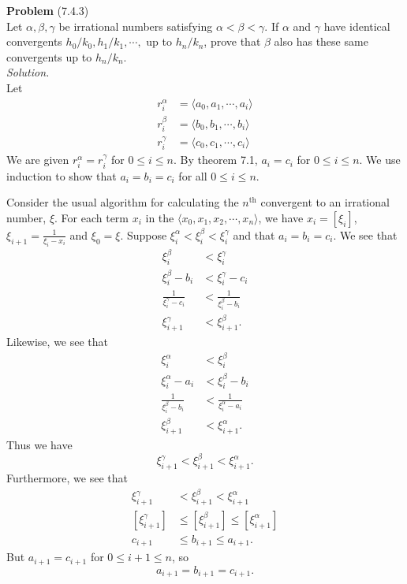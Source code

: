 \documentclass[12 pt]{amsart}
\begin{document}
\phantom{\quad} \vfill
\noindent
\textbf{Problem} (7.4.3) \\[4ex]
  Let $\alpha, \beta, \gamma$ be irrational numbers satisfying
  $\alpha < \beta < \gamma$.
  If $\alpha$ and $\gamma$ have identical convergents
  $h_0/k_0, h_1/k_1, \cdots,$ up to $h_n/k_n$, prove that
  $\beta$ also has these same convergents up to $h_n/k_n$.
  \\[2ex]
\emph{Solution.} \\[2ex]
  Let 
  \begin{align*}
    r_i^{\alpha} &= \langle a_0, a_1, \cdots, a_i \rangle \\
    r_i^{\beta} &= \langle b_0, b_1, \cdots, b_i \rangle \\
    r_i^{\gamma} &= \langle c_0, c_1, \cdots, c_i \rangle 
  \end{align*}
  We are given $r_i^{\alpha} = r_i^{\gamma}$ for
  $0 \leq i \leq n$.
  By theorem 7.1, $a_i = c_i$ for $0 \leq i \leq n$.
  We use induction to show that 
  $a_i = b_i = c_i$ for all $0 \leq i \leq n$.

  Consider the usual algorithm for calculating the 
  $n^{\text{th}}$ convergent to an irrational number, $\xi$.
  For each term $x_i$ in the 
  $\langle x_0, x_1, x_2, \cdots, x_n \rangle $, 
  we have $x_i = \left[ \xi_i \right]$,
  $\xi_{i+1} = \frac{1}{\xi_i - x_i}$ and 
  $\xi_0 = \xi$.
  Suppose 
  $\xi^{\alpha}_i < \xi^{\beta}_i < \xi^{\gamma}_i$
  and that $a_i = b_i = c_i$.
  We see that 
  \begin{align*}
    \xi_i^{\beta} &< \xi_i^{\gamma} \\
    \xi_i^{\beta} - b_i &< \xi_i^{\gamma} - c_i\\
    \frac{1}{\xi_i^{\gamma} - c_i} &< \frac{1}{\xi_i^{\beta} - b_i}\\
    \xi_{i+1}^{\gamma} &< \xi_{i+1}^{\beta}.
  \end{align*}
  Likewise, we see that
  \begin{align*}
    \xi_i^{\alpha} &< \xi_i^{\beta} \\
    \xi_i^{\alpha} - a_i &< \xi_i^{\beta} - b_i\\
    \frac{1}{\xi_i^{\beta} - b_i} &< \frac{1}{\xi_i^{\alpha} - a_i}\\
    \xi_{i+1}^{\beta} &< \xi_{i+1}^{\alpha}.
  \end{align*}
  Thus we have 
  \[
    \xi_{i+1}^{\gamma} < \xi_{i+1}^{\beta} < \xi_{i+1}^{\alpha}.
  \]
  Furthermore, we see that 
  \begin{align*}
    \xi_{i+1}^{\gamma} &< \xi_{i+1}^{\beta} < \xi_{i+1}^{\alpha} \\
    \left[ \xi_{i+1}^{\gamma} \right] 
      &\leq \left[ \xi_{i+1}^{\beta} \right] 
      \leq \left[ \xi_{i+1}^{\alpha} \right] \\
    c_{i+1} &\leq b_{i+1} \leq a_{i+1}.
  \end{align*}
  But $a_{i+1} = c_{i+1}$ for $0 \leq i+1 \leq n$, so 
  \[
    a_{i+1} = b_{i+1} =  c_{i+1}.
  \]
\end{document}
